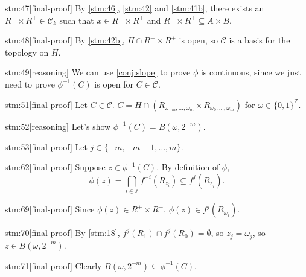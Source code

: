 \begin{stm}{stm:47}[final-proof]
By \ref{stm:46}, \ref{stm:42} and \ref{stm:41b}, there exists an $R^- \times R^+ \in \mathcal{C}_k$ such that $x \in R^- \times R^+$ and $R^- \times R^+ \subseteq A \times B$.
\end{stm}

\begin{stm}{stm:48}[final-proof]
By \ref{stm:42b}, $H \cap R^- \times R^+$ is open, so $\mathcal{C}$ is a basis for the topology on $H$.
\end{stm}

\begin{stm}{stm:49}[reasoning]
We can use \ref{conj:slope} to prove $\phi$ is continuous, since we just need to prove $\phi^{-1}(C)$ is open for $C \in \mathcal{C}$.
\end{stm}

\begin{stm}{stm:51}[final-proof]
Let $C \in \mathcal{C}$. $C = H \cap (R_{\omega_{-m}, \ldots, \omega_m} \times R_{\omega_0, \ldots, \omega_m})$ for $\omega \in \{0,1\}^{\mathbb{Z}}$.
\end{stm}

\begin{stm}{stm:52}[reasoning]
Let's show $\phi^{-1}(C) = B(\omega, 2^{-m})$.
\end{stm}

\begin{stm}{stm:53}[final-proof]
Let $j \in \{-m, -m+1, \ldots, m\}$.
\end{stm}

\begin{stm}{stm:62}[final-proof]
Suppose $z \in \phi^{-1}(C)$. By definition of $\phi$,
\[
\phi(z) = \bigcap_{i \in \mathbb{Z}} f^{-i}(R_{z_i}) \subseteq f^j(R_{z_j}).
\]
\end{stm}

\begin{stm}{stm:69}[final-proof]
Since $\phi(z) \in R^+ \times R^-$, $\phi(z) \in f^j(R_{\omega_j})$. 
\end{stm}

\begin{stm}{stm:70}[final-proof]
By \ref{stm:18}, $f^j(R_1) \cap f^j(R_0) = \emptyset$, so $z_j = \omega_j$, so $z \in B(\omega, 2^{-m})$.
\end{stm}

\begin{stm}{stm:71}[final-proof]
Clearly $B(\omega, 2^{-m}) \subseteq \phi^{-1}(C)$.
\end{stm}

